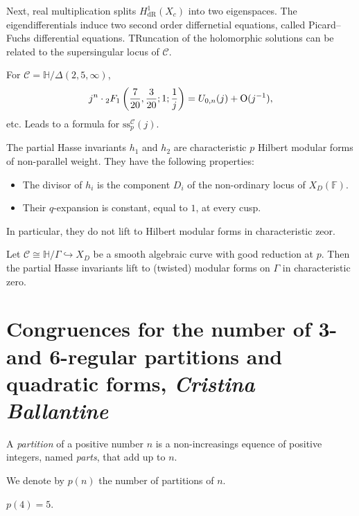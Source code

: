 \documentclass[reqno]{amsart} 
\begin{document}
Next, real multiplication splits $H_{\mathrm{d R}}^{1}(X_c)$ into two eigenspaces.  The eigendifferentials induce two second order differnetial equations, called Picard--Fuchs differential equations.  TRuncation of the holomorphic solutions can be related to the supersingular locus of $\mathcal{C}$.
\begin{example}
  For $\mathcal{C} = \mathbb{H} / \Delta(2, 5, \infty)$,
  \begin{equation*}
    j^n \cdot {}_2 F_1 \left( \frac{7}{20}, \frac{3}{20}; 1 ; \frac{1}{j} \right)
    = U_{0, n}(j) + \operatorname{O}(j^{-1}),
  \end{equation*}
  etc.  Leads to a formula for $\mathrm{ss}_p^{\mathcal{C}}(j)$.
\end{example}

The partial Hasse invariants $h_1$ and $h_2$ are characteristic $p$ Hilbert modular forms of non-parallel weight.  They have the following properties:
\begin{itemize}
\item The divisor of $h_i$ is the component $D_i$ of the non-ordinary locus of $X_D(\mathbb{F})$.
\item Their $q$-expansion is constant, equal to $1$, at every cusp.
\end{itemize}
In particular, they do not lift to Hilbert modular forms in characteristic zeor.

\begin{theorem} [B--Li, 2024]
  Let $\mathcal{C} \cong \mathbb{H} / \Gamma \hookrightarrow X_D$ be a smooth algebraic curve with good reduction at $p$.  Then the partial Hasse invariants lift to (twisted) modular forms on $\Gamma$ in characteristic zero.
\end{theorem}

\section{Congruences for the number of 3- and 6-regular partitions and quadratic forms, \textnormal{\emph{Cristina Ballantine}}}

\begin{definition}
  A \emph{partition} of a positive number $n$ is a non-increasings equence of positive integers, named \emph{parts}, that add up to $n$.
\end{definition}
We denote by $p(n)$ the number of partitions of $n$.

\begin{example}
  $p(4) = 5$.
\end{example}
\end{document}
